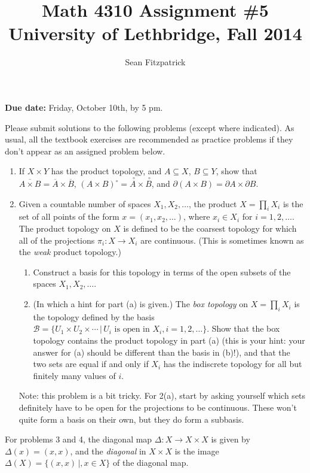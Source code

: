 \documentclass[letterpaper,12pt]{article}
\title{Math 4310 Assignment \#5\\University of Lethbridge, Fall 2014}
\author{Sean Fitzpatrick}
\newcommand{\inter}[1]{\overset{\,\,\circ}{#1}}
\begin{document}
 \maketitle

{\bf Due date:} Friday, October 10th, by 5 pm.

\bigskip

Please submit solutions to the following problems (except where indicated). As usual, all the textbook exercises are recommended as practice problems if they don't appear as an assigned problem below.

\begin{enumerate}
\item If $X\times Y$ has the product topology, and $A\subseteq X$, $B\subseteq Y$, show that $\overline{A\times B} = \overline{A}\times \overline{B}$, $(A\times B)^\circ = \inter{A}\times\inter{B}$, and $\partial (A\times B) = \partial A\times \partial B$.
\item Given a countable number of spaces $X_1,X_2,\ldots$, the product $X=\prod_i X_i$ is the set of all points of the form $x=(x_1,x_2,\ldots)$, where $x_i\in X_i$ for $i=1,2,\ldots$. The product topology on $X$ is defined to be the coarsest topology for which all of the projections $\pi_i:X\to X_i$ are continuous. (This is sometimes known as the {\em weak} product topology.)
\begin{enumerate}
 \item Construct a basis for this topology in terms of the open subsets of the spaces $X_1,X_2,\ldots$.
 \item (In which a hint for part (a) is given.) The {\em box topology} on $X=\prod_i X_i$ is the topology defined by the basis $\mathcal{B} = \{U_1\times U_2\times \cdots \,|\, U_i \text{ is open in } X_i, i=1,2,\ldots\}$. Show that the box topology contains the product topology in part (a) (this is your hint: your answer for (a) should be different than the basis in (b)!), and that the two sets are equal if and only if $X_i$ has the indiscrete topology for all but finitely many values of $i$.
\end{enumerate}
Note: this problem is a bit tricky. For 2(a), start by asking yourself which sets definitely have to be open for the projections to be continuous. These won't quite form a basis on their own, but they do form a subbasis.
\end{enumerate}
For problems 3 and 4, the diagonal map $\Delta:X\to X\times X$ is given by $\Delta(x) = (x,x)$, and the {\em diagonal} in $X\times X$ is the image $\Delta(X) = \{(x,x)\,|, x\in X\}$ of the diagonal map.
\end{document}
